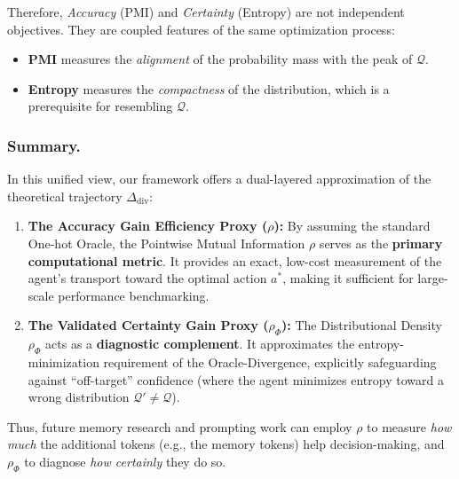 Therefore, \emph{Accuracy} (PMI) and \emph{Certainty} (Entropy) are not independent objectives. They are coupled features of the same optimization process:
\begin{itemize}
    \item \textbf{PMI} measures the \emph{alignment} of the probability mass with the peak of $\mathcal{Q}$.
    \item \textbf{Entropy} measures the \emph{compactness} of the distribution, which is a prerequisite for resembling $\mathcal{Q}$.
\end{itemize}

\subsubsection{Summary.}
In this unified view, our framework offers a dual-layered approximation of the theoretical trajectory $\Delta_{\text{div}}$:

\begin{enumerate}
    \item \textbf{The Accuracy Gain Efficiency Proxy ($\rho$):} 
    By assuming the standard One-hot Oracle, the Pointwise Mutual Information $\rho$ serves as the \textbf{primary computational metric}. It provides an exact, low-cost measurement of the agent's transport toward the optimal action $a^*$, making it sufficient for large-scale performance benchmarking.

    \item \textbf{The Validated Certainty Gain Proxy ($\rho_{\Phi}$):} 
    The Distributional Density $\rho_{\Phi}$ acts as a \textbf{diagnostic complement}. It approximates the entropy-minimization requirement of the Oracle-Divergence, explicitly safeguarding against ``off-target'' confidence (where the agent minimizes entropy toward a wrong distribution $\mathcal{Q}' \neq \mathcal{Q}$).
\end{enumerate}

Thus, future memory research and prompting work can employ $\rho$ to measure \emph{how much} the additional tokens (e.g., the memory tokens) help decision-making, and $\rho_{\Phi}$ to diagnose \emph{how certainly} they do so.